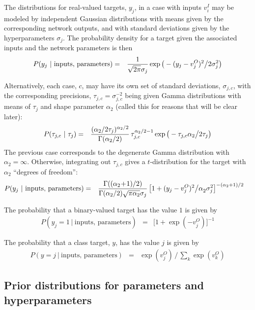 \documentclass{report}[11pt]
\def\beq{\begin{eqnarray}}
\def\eeq{\end{eqnarray}}
\def\eep{\end{eqnarray}}
\begin{document}
The distributions for real-valued targets, $y_j$, in a case with inputs 
$v^I_i$ may be modeled by independent Gaussian distributions 
with means given by the corresponding network outputs, and with
standard deviations given by the hyperparameters $\sigma_{j}$.  
The probability density for a target given the associated inputs and
the network parameters is then\beq
  P(y_j\ |\ \mbox{inputs},\, \mbox{parameters}) & = &
    {1 \over \sqrt{2\pi} \sigma_{j}} 
    \exp \big( - (y_j-v^O_j)^2 \big/ 2\sigma_{j}^2 \big)
\label{regg}\eep

Alternatively, each case, $c$, may have its own set of standard
deviations, $\sigma_{j,c}$, with the corresponding precisions,
$\tau_{j,c} = \sigma_{j,c}^{-2}$ being given Gamma distributions with
means of $\tau_{j}$ and shape parameter $\alpha_2$ (called this for
reasons that will be clear later):\beq
  P(\tau_{j,c}\ |\ \tau_{j}) 
   & = & {(\alpha_2/2\tau_j)^{\alpha_2/2} \over \Gamma(\alpha_2/2)}\,
         \tau_{j,c}^{\alpha_2/2-1}
         \exp \big(-\tau_{j,c} \alpha_2 \big/ 2 \tau_{j} \big)
\eeq%
The previous case corresponds to the degenerate Gamma distribution
with $\alpha_2=\infty$.  Otherwise, integrating out $\tau_{j,c}$ gives a 
$t$-distribution for the target with $\alpha_2$ ``degrees of freedom'':\beq
  P(y_j\ |\ \mbox{inputs},\, \mbox{parameters}) & = &
    {\Gamma((\alpha_2\!+\!1)/2) \over \Gamma(\alpha_2/2) 
     \sqrt{\pi\alpha_2}\sigma_j}\,
     \big[ 1 + (y_j-v^O_j)^2\big/\alpha_2^{\ }\sigma_j^2 \big]^{-(\alpha_2+1)/2}
     \ \ \
\label{regt}\eep

The probability that a binary-valued target has the value $1$ is given by \beq
  P(y_j = 1\ |\ \mbox{inputs},\, \mbox{parameters}) & = & 
    \big[ 1 + \exp(-v^O_j) \big]^{-1}
\label{bin}\eep

The probability that a class target, $y$, has the value $j$ is given by\beq
  P(y = j\ |\ \mbox{inputs},\, \mbox{parameters}) & = & 
    \textstyle \exp(v^O_j) \,\big/\, \sum\limits_k \exp(v^O_k)
\label{softmax}\eep


\subsection*{Prior distributions for parameters and hyperparameters}
\end{document}
